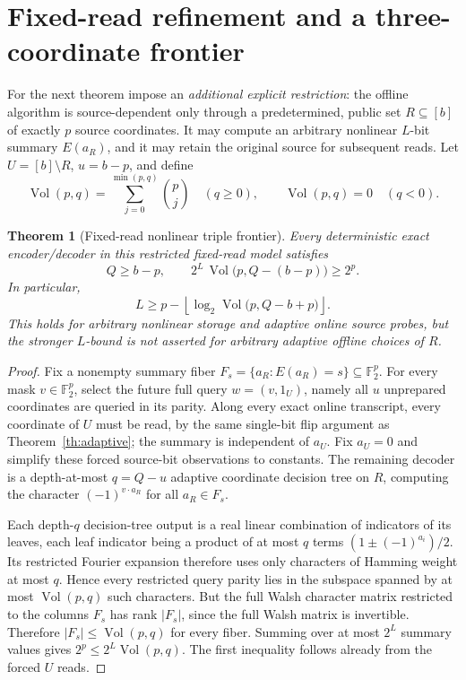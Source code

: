 \documentclass[10pt]{article}
\newtheorem{theorem}{Theorem}
\newcommand{\F}{\mathbb F_2}
\newcommand{\V}{\operatorname{Vol}}
\begin{document}
\section{Fixed-read refinement and a three-coordinate frontier}
For the next theorem impose an \emph{additional explicit restriction}: the offline algorithm is source-dependent only through a predetermined, public set $R\subseteq[b]$ of exactly $p$ source coordinates. It may compute an arbitrary nonlinear $L$-bit summary $E(a_R)$, and it may retain the original source for subsequent reads. Let $U=[b]\setminus R$, $u=b-p$, and define
\[
 \V(p,q)=\sum_{j=0}^{\min(p,q)}\binom pj\quad(q\ge0),\qquad \V(p,q)=0\quad(q<0).
\]
\begin{theorem}[Fixed-read nonlinear triple frontier]\label{th:fixed}
Every deterministic exact encoder/decoder in this restricted fixed-read model satisfies
\[
 \boxed{Q\ge b-p},\qquad
 \boxed{2^L\,\V\bigl(p,Q-(b-p)\bigr)\ge2^p}.
\]
In particular,
\[
 \boxed{L\ge p-\left\lfloor\log_2\V\bigl(p,Q-b+p\bigr)\right\rfloor.}
\]
This holds for arbitrary nonlinear storage and adaptive online source probes, but the stronger $L$-bound is \emph{not} asserted for arbitrary adaptive offline choices of $R$.
\end{theorem}
\begin{proof}
Fix a nonempty summary fiber $F_s=\{a_R:E(a_R)=s\}\subseteq\F^p$. For every mask $v\in\F^p$, select the future full query $w=(v,1_U)$, namely all $u$ unprepared coordinates are queried in its parity. Along every exact online transcript, every coordinate of $U$ must be read, by the same single-bit flip argument as Theorem~\ref{th:adaptive}; the summary is independent of $a_U$. Fix $a_U=0$ and simplify these forced source-bit observations to constants. The remaining decoder is a depth-at-most $q=Q-u$ adaptive coordinate decision tree on $R$, computing the character $(-1)^{v\cdot a_R}$ for all $a_R\in F_s$.

Each depth-$q$ decision-tree output is a real linear combination of indicators of its leaves, each leaf indicator being a product of at most $q$ terms $(1\pm(-1)^{a_i})/2$. Its restricted Fourier expansion therefore uses only characters of Hamming weight at most $q$. Hence every restricted query parity lies in the subspace spanned by at most $\V(p,q)$ such characters. But the full Walsh character matrix restricted to the columns $F_s$ has rank $|F_s|$, since the full Walsh matrix is invertible. Therefore $|F_s|\le\V(p,q)$ for every fiber. Summing over at most $2^L$ summary values gives $2^p\le2^L\V(p,q)$. The first inequality follows already from the forced $U$ reads.\end{proof}
\end{document}
